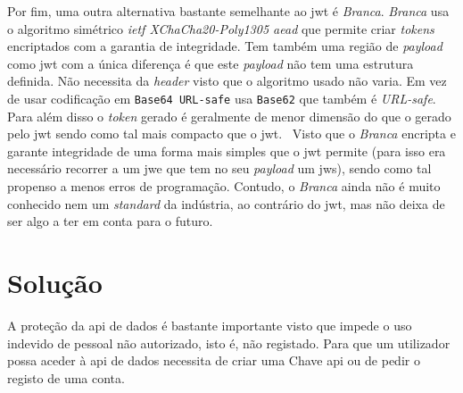 Por fim, uma outra alternativa bastante semelhante ao \acrshort{jwt} é \textit{Branca}. 
\textit{Branca} usa o algoritmo simétrico \textit{\acrshort{ietf} XChaCha20-Poly1305 \acrshort{aead}} que permite 
criar \textit{tokens} encriptados com a garantia de integridade. Tem também uma região de \textit{payload} como 
\acrshort{jwt} com a única diferença é que este \textit{payload} não tem uma estrutura definida. Não necessita da 
\textit{header} visto que o algoritmo usado não varia. Em vez de usar codificação em \texttt{Base64 URL-safe} 
usa \texttt{Base62} que também é \textit{URL-safe}. Para além disso o \textit{token} gerado é geralmente de menor 
dimensão do que o gerado pelo \acrshort{jwt} sendo como tal mais compacto que o \acrshort{jwt}.~\cite{branca} 
Visto que o \textit{Branca} encripta e garante integridade de uma forma mais simples que o \acrshort{jwt} 
permite (para isso era necessário recorrer a um \acrshort{jwe} que tem no seu \textit{payload} um \acrshort{jws}), 
sendo como tal propenso a menos erros de programação. 
Contudo, o \textit{Branca} ainda não é muito conhecido nem um \textit{standard} da indústria, ao contrário do 
\acrshort{jwt}, mas não deixa de ser algo a ter em conta para o futuro. 

\section{Solução}

A proteção da \acrshort{api} de dados é bastante importante visto que impede o uso indevido de pessoal não 
autorizado, isto é, não registado. Para que um utilizador possa aceder à \acrshort{api} de dados necessita de 
criar uma Chave \acrshort{api} ou de pedir o registo de uma conta. 

